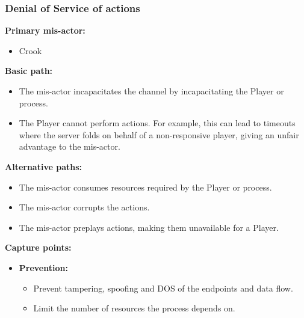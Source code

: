 \documentclass[a4paper,11pt]{report}
\begin{document}
\subsubsection{Denial of Service of actions}
\label{PlayerFlowCasesD3}
\textbf{Primary mis-actor:}
\begin{itemize}
\item Crook
\end{itemize}
\textbf{Basic path:}
\begin{itemize}
\item The mis-actor incapacitates the channel by incapacitating the Player or process.
\item The Player cannot perform actions. For example, this can lead to timeouts where the server folds on behalf of a non-responsive player, giving an unfair advantage to the mis-actor.
\end{itemize}
\textbf{Alternative paths:}
\begin{itemize}
\item The mis-actor consumes resources required by the Player or process.
\item The mis-actor corrupts the actions.
\item The mis-actor preplays actions, making them unavailable for a Player.
\end{itemize}
\textbf{Capture points:}
\begin{itemize}
\item \textbf{Prevention:}
\begin{itemize}
\item Prevent tampering, spoofing and DOS of the endpoints and data flow.
\item Limit the number of resources the process depends on.
\end{itemize}
\end{itemize}
\end{document}
